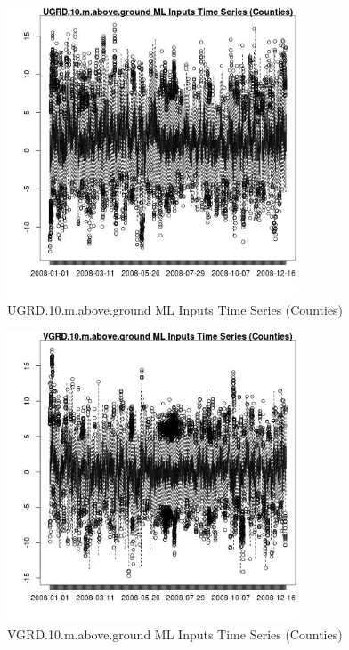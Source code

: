 \begin{figure} 
\centering  
\includegraphics[width=0.77\textwidth]{Code_Outputs/ML_input_report_ML_input_CountyGeometricCentroids_Locations_Dates_part_c_2008-01-01to2008-12-31_UGRD.10.m.above.groundTS.jpg} 
\caption{\label{fig:ML_input_report_ML_input_CountyGeometricCentroids_Locations_Dates_part_c_2008-01-01to2008-12-31UGRD.10.m.above.groundTS}UGRD.10.m.above.ground ML Inputs Time Series (Counties)} 
\end{figure} 
 

\begin{figure} 
\centering  
\includegraphics[width=0.77\textwidth]{Code_Outputs/ML_input_report_ML_input_CountyGeometricCentroids_Locations_Dates_part_c_2008-01-01to2008-12-31_VGRD.10.m.above.groundTS.jpg} 
\caption{\label{fig:ML_input_report_ML_input_CountyGeometricCentroids_Locations_Dates_part_c_2008-01-01to2008-12-31VGRD.10.m.above.groundTS}VGRD.10.m.above.ground ML Inputs Time Series (Counties)} 
\end{figure} 
 

